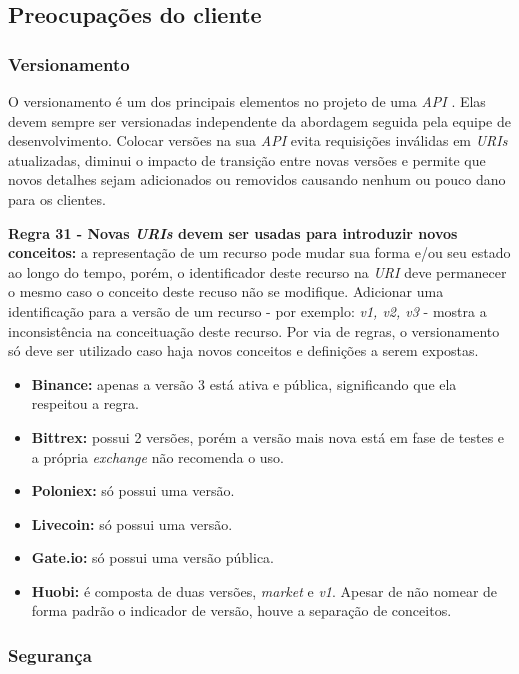 \subsection{Preocupações do cliente}

\subsubsection{Versionamento}

O versionamento é um dos principais elementos no projeto de uma \textit{API} \cite{De2017}. Elas devem sempre ser versionadas independente da abordagem seguida pela equipe de desenvolvimento. Colocar versões na sua \textit{API} evita requisições inválidas em \textit{URIs} atualizadas, diminui o impacto de transição entre novas versões e permite que novos detalhes sejam adicionados ou removidos causando nenhum ou pouco dano para os clientes.

\textbf{Regra 31 - Novas \textit{URIs} devem ser usadas para introduzir novos conceitos:} a representação de um recurso pode mudar sua forma e/ou seu estado ao longo do tempo, porém, o identificador deste recurso na \textit{URI} deve permanecer o mesmo caso o conceito deste recuso não se modifique. Adicionar uma identificação para a versão de um recurso - por exemplo: \textit{v1, v2, v3} - mostra a inconsistência na conceituação deste recurso. Por via de regras, o versionamento só deve ser utilizado caso haja novos conceitos e definições a serem expostas.

\begin{itemize}
    \item \textbf{Binance:} apenas a versão 3 está ativa e pública, significando que ela respeitou a regra.
    \item \textbf{Bittrex:} possui 2 versões, porém a versão mais nova está em fase de testes e a própria \textit{exchange} não recomenda o uso.
    \item \textbf{Poloniex:} só possui uma versão.
    \item \textbf{Livecoin:} só possui uma versão.
    \item \textbf{Gate.io:} só possui uma versão pública.
    \item \textbf{Huobi:} é composta de duas versões, \textit{market} e \textit{v1}. Apesar de não nomear de forma padrão o indicador de versão, houve a separação de conceitos.
\end{itemize}

\subsubsection{Segurança}

